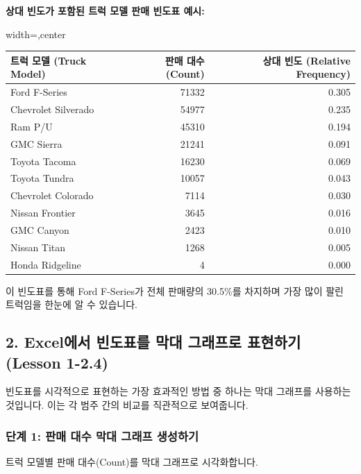 \documentclass[11pt,a4paper]{article}
\begin{document}
\begin{examplebox}
\textbf{상대 빈도가 포함된 트럭 모델 판매 빈도표 예시:}
\begin{adjustbox}{width=\textwidth,center}
\begin{tabular}{lrr}
\toprule
\textbf{트럭 모델 (Truck Model)} & \textbf{판매 대수 (Count)} & \textbf{상대 빈도 (Relative Frequency)} \\
\midrule
Ford F-Series & 71332 & 0.305 \\
Chevrolet Silverado & 54977 & 0.235 \\
Ram P/U & 45310 & 0.194 \\
GMC Sierra & 21241 & 0.091 \\
Toyota Tacoma & 16230 & 0.069 \\
Toyota Tundra & 10057 & 0.043 \\
Chevrolet Colorado & 7114 & 0.030 \\
Nissan Frontier & 3645 & 0.016 \\
GMC Canyon & 2423 & 0.010 \\
Nissan Titan & 1268 & 0.005 \\
Honda Ridgeline & 4 & 0.000 \\
\bottomrule
\end{tabular}
\end{adjustbox}
\end{examplebox}
이 빈도표를 통해 Ford F-Series가 전체 판매량의 30.5\%를 차지하며 가장 많이 팔린 트럭임을 한눈에 알 수 있습니다.

\newpage
\subsection*{2. Excel에서 빈도표를 막대 그래프로 표현하기 (Lesson 1-2.4)}

빈도표를 시각적으로 표현하는 가장 효과적인 방법 중 하나는 막대 그래프를 사용하는 것입니다. 이는 각 범주 간의 비교를 직관적으로 보여줍니다.

\subsubsection*{단계 1: 판매 대수 막대 그래프 생성하기}
트럭 모델별 판매 대수(Count)를 막대 그래프로 시각화합니다.
\end{document}
